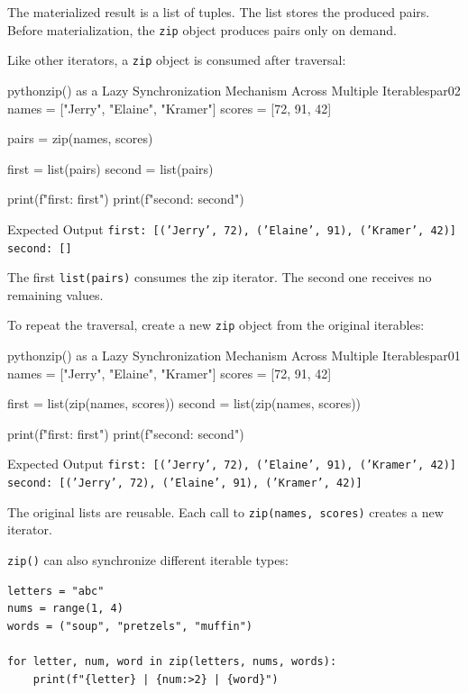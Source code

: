 \documentclass[a4paper,twoside]{report}
\begin{document}
The materialized result is a list of tuples. The list stores the produced pairs. Before materialization, the \texttt{zip} object produces pairs only on demand.

Like other iterators, a \texttt{zip} object is consumed after traversal:

\begin{codebox}[]{python}{zip() as a Lazy Synchronization Mechanism Across Multiple Iterables}{par02}
names = ["Jerry", "Elaine", "Kramer"]
scores = [72, 91, 42]

pairs = zip(names, scores)

first = list(pairs)
second = list(pairs)

print(f"first: {first}")
print(f"second: {second}")
\end{codebox}


\begin{iobox}{Expected Output}
\texttt{first: [('Jerry', 72), ('Elaine', 91), ('Kramer', 42)]} \\
\texttt{second: []} \\
\end{iobox}


The first \texttt{list(pairs)} consumes the zip iterator. The second one receives no remaining values.

To repeat the traversal, create a new \texttt{zip} object from the original iterables:

\begin{codebox}[]{python}{zip() as a Lazy Synchronization Mechanism Across Multiple Iterables}{par01}
names = ["Jerry", "Elaine", "Kramer"]
scores = [72, 91, 42]

first = list(zip(names, scores))
second = list(zip(names, scores))

print(f"first: {first}")
print(f"second: {second}")
\end{codebox}


\begin{iobox}{Expected Output}
\texttt{first: [('Jerry', 72), ('Elaine', 91), ('Kramer', 42)]} \\
\texttt{second: [('Jerry', 72), ('Elaine', 91), ('Kramer', 42)]} \\
\end{iobox}


The original lists are reusable. Each call to \texttt{zip(names, scores)} creates a new iterator.

\texttt{zip()} can also synchronize different iterable types:

\begin{verbatim}
letters = "abc"
nums = range(1, 4)
words = ("soup", "pretzels", "muffin")

for letter, num, word in zip(letters, nums, words):
    print(f"{letter} | {num:>2} | {word}")
\end{verbatim}
\end{document}
